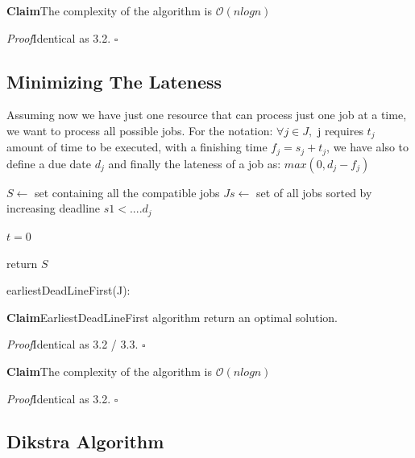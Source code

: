 \documentclass[11pt]{article}
\newenvironment{claim}[1]{\par\textbf{Claim}\space#1}{}
\newenvironment{proof}[1]{\par\textit{Proof}\space#1}{\hfill\ensuremath{\square}}
\begin{document}
\begin{claim}
The complexity of the algorithm is $\mathcal{O}{(nlogn)}$
\end{claim}
\begin{proof}
Identical as 3.2.
\end{proof}\\

\subsection{Minimizing The Lateness}
Assuming now we have just one resource that can process just one job at a time, we want to process all possible jobs. For the notation: $\forall j \in J,$ j requires  $t_{j}$ amount  of time to be executed, with a finishing time $f_{j} = s_{j} + t_{j}$, we have also to define a due date $d_{j}$ and finally the lateness of a job as: $max (0,d_{j}-f_{j})$

\begin{algorithm}[H]
\SetAlgoLined
\small
{}
\BlankLine

$S \leftarrow$ set containing all the compatible jobs\;
$Js \leftarrow$ set of all jobs sorted by increasing deadline $s1 < .... d_{j}$

\BlankLine
$t = 0 $\;

\BlankLine

return $S$\;
\caption{earliestDeadLineFirst(J):}
\end{algorithm}

\begin{claim}
EarliestDeadLineFirst algorithm return an optimal solution.
\end{claim}
\begin{proof}
Identical as 3.2 / 3.3.
\end{proof}\\
 
\begin{claim}
The complexity of the algorithm is $\mathcal{O}{(nlogn)}$
\end{claim}
\begin{proof}
Identical as 3.2.
\end{proof}\\

\clearpage

\subsection{Dikstra Algorithm}
\end{document}
